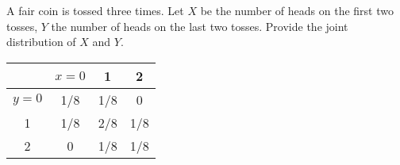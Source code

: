 \documentclass[titlepage, 12pt, leqno]{article}
\begin{document}
\begin{ex}
    A fair coin is tossed three times. Let $X$ be the number of heads on the first
    two tosses, $Y$ the number of heads on the last two tosses. Provide the joint
    distribution of $X$ and $Y$.

    \begin{center}
    \begin{tabular}{c|c |c |c}
        &$x=0$& 1&2 \\
        \hline
        $y=0$ & 1/8&1/8&0\\
        \hline
        1&1/8&2/8&1/8\\
        \hline
        2&0&1/8&1/8
    \end{tabular}
    \end{center}
\end{ex}
\end{document}
